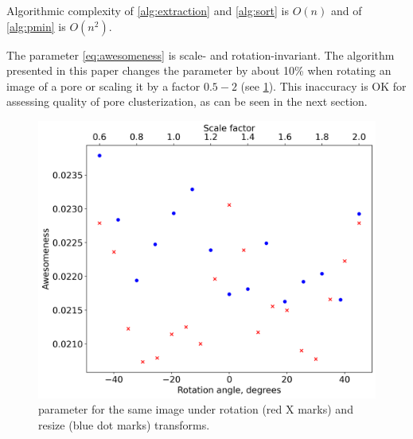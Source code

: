 \documentclass[reprint,amsmath,amssymb,aps,pre,showkeys,showpacs]{revtex4-1}
\newcommand{\highlight}[1]{{\color{red}{#1}}} %
\begin{document}
Algorithmic complexity of \ref{alg:extraction} and \ref{alg:sort} is $O(n)$ and
of \ref{alg:pmin} is $O(n^2)$.

The parameter \cref{eq:awesomeness} is scale- and rotation-invariant. The
algorithm presented in this paper changes the parameter by about 10\% when
rotating an image of a pore or scaling it by a factor $0.5-2$ (see
\cref{fig:rotation-resize}). This inaccuracy is OK for assessing quality of pore
clusterization, as can be seen in the next section.
\begin{figure}
  \centering
  \includegraphics[width=0.9\linewidth]{images/rotation-resize.png}
  \caption[]{\highlight{Awesomeness} parameter for the same image under rotation
  (red X marks) and resize (blue dot marks) transforms.}
  \label{fig:rotation-resize}
\end{figure}
\end{document}
